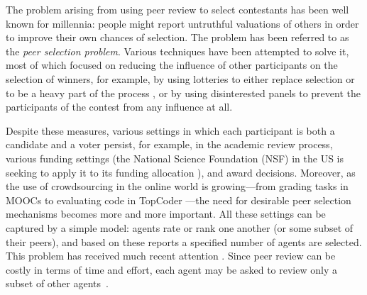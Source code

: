 \documentclass[letterpaper]{article}
\newcommand{\haris}[1]{\textcolor{green}{\textbf{Haris Says: #1}}}
\newcommand{\omer}[1]{\textcolor{purple}{\textbf{Omer Says: #1}}}
\newcommand{\citep}{\cite}
\begin{document}
The problem arising from using peer review to select contestants has been well known for millennia:
people might report untruthful valuations of others in order to improve their own chances of selection.
The problem has been referred to as the \emph{peer selection problem}.
Various techniques have been attempted to solve it, most of which focused on reducing the influence of other participants on the selection of winners, for example, by using lotteries to either replace selection or to be a heavy part of the process \cite{MG07}, 
or by using disinterested panels to prevent the participants of the contest from any influence at all.

Despite these measures, various settings in which each participant is both a candidate and a voter persist, for example, in the academic review process, various funding settings (the National Science Foundation (NSF) in the US is seeking to apply it to its funding allocation \cite{Haze13a}), and award decisions. Moreover, as the use of crowdsourcing in the online world is growing---from grading tasks in MOOCs to evaluating code in TopCoder \cite{LGE10}---the need for desirable peer selection mechanisms becomes more and more important. All these settings can be captured by a simple model: agents rate or rank one another (or some subset of their peers), and based on these reports a specified number of agents are selected. This problem has received much recent attention \citep{AFPT11a,FeKl14a,HoMo13a,KLMP15b,RRS11a}. Since peer review can be costly in terms of time and effort, each agent may be asked to review only a subset of other agents~\citep{KLMP15b,MeSa09a}.
\end{document}
